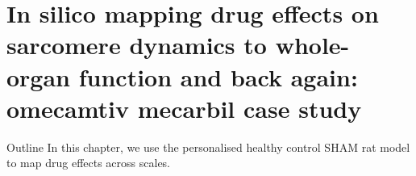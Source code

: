 \chapter{In silico mapping drug effects on sarcomere dynamics to whole-organ 
function and back again: omecamtiv mecarbil case study}\label{cha:chapter5}
%
%
%
\begin{remark}{Outline}
    In this chapter, we use the personalised healthy control SHAM rat model to map drug effects across scales.
\end{remark}





